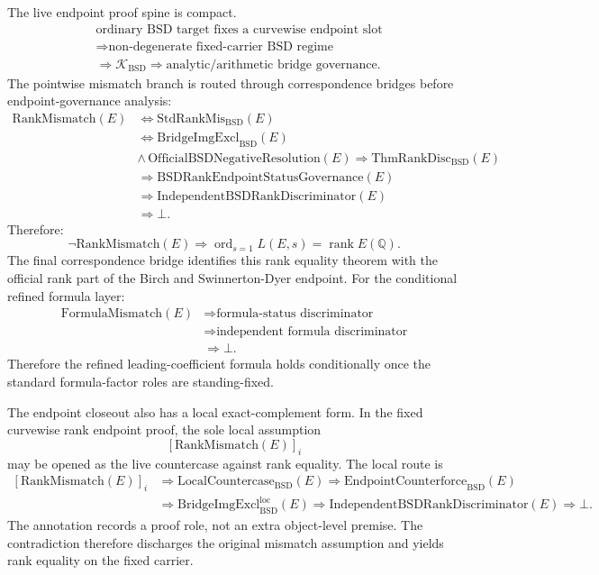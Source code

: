 \documentclass[11pt]{article}
\newcommand{\Q}{\mathbb{Q}}
\newcommand{\rank}{\operatorname{rank}}
\newcommand{\ord}{\operatorname{ord}}
\newcommand{\BSD}{\mathrm{BSD}}
\newcommand{\RankMismatch}{\mathrm{RankMismatch}}
\newcommand{\StdRankMis}{\mathrm{StdRankMis}_{\BSD}}
\newcommand{\BridgeImgExcl}{\mathrm{BridgeImgExcl}_{\BSD}}
\newcommand{\BridgeImgExclLoc}{\mathrm{BridgeImgExcl}^{\mathrm{loc}}_{\BSD}}
\newcommand{\ThmRankDisc}{\mathrm{ThmRankDisc}_{\BSD}}
\newcommand{\LocalCountercaseBSD}{\mathrm{LocalCountercase}_{\BSD}}
\newcommand{\EndpointCounterforceBSD}{\mathrm{EndpointCounterforce}_{\BSD}}
\newcommand{\FormulaMismatch}{\mathrm{FormulaMismatch}}
\newcommand{\Kern}{\mathcal{K}}
\begin{document}
The live endpoint proof spine is compact.
\[
\begin{aligned}
&\text{ordinary BSD target fixes a curvewise endpoint slot}\\
&\Rightarrow \text{non-degenerate fixed-carrier BSD regime}\\
&\Rightarrow \Kern_{\BSD}
\Rightarrow \text{analytic/arithmetic bridge governance}.
\end{aligned}
\]
The pointwise mismatch branch is routed through correspondence bridges before endpoint-governance analysis:
\[
\begin{aligned}
\RankMismatch(E)
&\Longleftrightarrow \StdRankMis(E)\\
&\Longleftrightarrow \BridgeImgExcl(E)\\
&\wedge\,\mathrm{OfficialBSDNegativeResolution}(E)\Rightarrow \ThmRankDisc(E)\\
&\Rightarrow \mathrm{BSDRankEndpointStatusGovernance}(E)\\
&\Rightarrow \mathrm{IndependentBSDRankDiscriminator}(E)\\
&\Rightarrow \bot.
\end{aligned}
\]
Therefore:
\[
\neg\RankMismatch(E)
\Rightarrow
\ord_{s=1}L(E,s)=\rank E(\Q).
\]
The final correspondence bridge identifies this rank equality theorem with the official rank part of the Birch and Swinnerton-Dyer endpoint.
For the conditional refined formula layer:
\[
\begin{aligned}
\FormulaMismatch(E)
&\Rightarrow \text{formula-status discriminator}\\
&\Rightarrow \text{independent formula discriminator}\\
&\Rightarrow \bot.
\end{aligned}
\]
Therefore the refined leading-coefficient formula holds conditionally once the standard formula-factor roles are standing-fixed.

The endpoint closeout also has a local exact-complement form. In the fixed curvewise rank endpoint proof, the sole local assumption
\[
[\RankMismatch(E)]_i
\]
may be opened as the live countercase against rank equality. The local route is
\[
\begin{aligned}
[\RankMismatch(E)]_i
&\Rightarrow \LocalCountercaseBSD(E)\Rightarrow \EndpointCounterforceBSD(E)\\
&\Rightarrow \BridgeImgExclLoc(E)\Rightarrow \mathrm{IndependentBSDRankDiscriminator}(E)\Rightarrow \bot.
\end{aligned}
\]
The annotation records a proof role, not an extra object-level premise. The contradiction therefore discharges the original mismatch assumption and yields rank equality on the fixed carrier.
\end{document}

